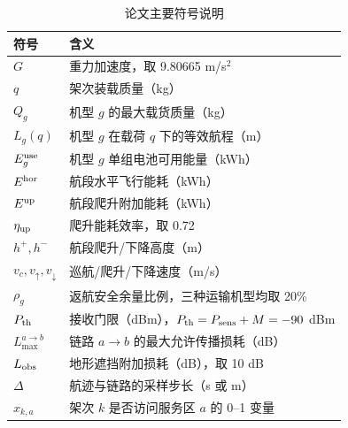\begin{table}[htbp]
\centering
\caption{论文主要符号说明}
\label{tab:symbols}
\small
\begin{tabular}{lp{11.5cm}}
\toprule
符号 & 含义 \\
\midrule
$G$ & 重力加速度，取 9.80665 m/s$^2$ \\
$q$ & 架次装载质量（kg） \\
$Q_g$ & 机型 $g$ 的最大载货质量（kg） \\
$L_g(q)$ & 机型 $g$ 在载荷 $q$ 下的等效航程（m） \\
$E_g^{\rm use}$ & 机型 $g$ 单组电池可用能量（kWh） \\
$E^{\rm hor}$ & 航段水平飞行能耗（kWh） \\
$E^{\rm up}$ & 航段爬升附加能耗（kWh） \\
$\eta_{\rm up}$ & 爬升能耗效率，取 0.72 \\
$h^{+},h^{-}$ & 航段爬升/下降高度（m） \\
$v_c,v_{\uparrow},v_{\downarrow}$ & 巡航/爬升/下降速度（m/s） \\
$\rho_g$ & 返航安全余量比例，三种运输机型均取 20\% \\
$P_{\rm th}$ & 接收门限（dBm），$P_{\rm th}=P_{\rm sens}+M=-90$ dBm \\
$L_{\max}^{a\to b}$ & 链路 $a\to b$ 的最大允许传播损耗（dB） \\
$L_{\rm obs}$ & 地形遮挡附加损耗（dB），取 10 dB \\
$\Delta$ & 航迹与链路的采样步长（s 或 m） \\
$x_{k,a}$ & 架次 $k$ 是否访问服务区 $a$ 的 0--1 变量 \\
\bottomrule
\end{tabular}
\end{table}

